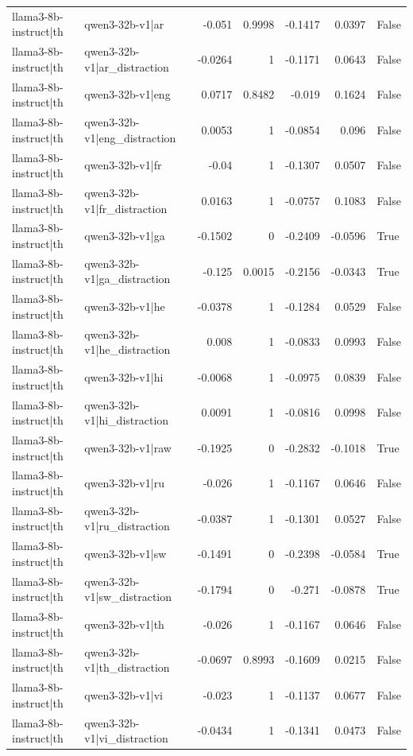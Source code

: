 \begin{table}
\begin{tabular}{l l r r r r l}
llama3-8b-instruct|th & qwen3-32b-v1|ar & -0.051 & 0.9998 & -0.1417 & 0.0397 & False \\
llama3-8b-instruct|th & qwen3-32b-v1|ar_distraction & -0.0264 & 1 & -0.1171 & 0.0643 & False \\
llama3-8b-instruct|th & qwen3-32b-v1|eng & 0.0717 & 0.8482 & -0.019 & 0.1624 & False \\
llama3-8b-instruct|th & qwen3-32b-v1|eng_distraction & 0.0053 & 1 & -0.0854 & 0.096 & False \\
llama3-8b-instruct|th & qwen3-32b-v1|fr & -0.04 & 1 & -0.1307 & 0.0507 & False \\
llama3-8b-instruct|th & qwen3-32b-v1|fr_distraction & 0.0163 & 1 & -0.0757 & 0.1083 & False \\
llama3-8b-instruct|th & qwen3-32b-v1|ga & -0.1502 & 0 & -0.2409 & -0.0596 & True \\
llama3-8b-instruct|th & qwen3-32b-v1|ga_distraction & -0.125 & 0.0015 & -0.2156 & -0.0343 & True \\
llama3-8b-instruct|th & qwen3-32b-v1|he & -0.0378 & 1 & -0.1284 & 0.0529 & False \\
llama3-8b-instruct|th & qwen3-32b-v1|he_distraction & 0.008 & 1 & -0.0833 & 0.0993 & False \\
llama3-8b-instruct|th & qwen3-32b-v1|hi & -0.0068 & 1 & -0.0975 & 0.0839 & False \\
llama3-8b-instruct|th & qwen3-32b-v1|hi_distraction & 0.0091 & 1 & -0.0816 & 0.0998 & False \\
llama3-8b-instruct|th & qwen3-32b-v1|raw & -0.1925 & 0 & -0.2832 & -0.1018 & True \\
llama3-8b-instruct|th & qwen3-32b-v1|ru & -0.026 & 1 & -0.1167 & 0.0646 & False \\
llama3-8b-instruct|th & qwen3-32b-v1|ru_distraction & -0.0387 & 1 & -0.1301 & 0.0527 & False \\
llama3-8b-instruct|th & qwen3-32b-v1|sw & -0.1491 & 0 & -0.2398 & -0.0584 & True \\
llama3-8b-instruct|th & qwen3-32b-v1|sw_distraction & -0.1794 & 0 & -0.271 & -0.0878 & True \\
llama3-8b-instruct|th & qwen3-32b-v1|th & -0.026 & 1 & -0.1167 & 0.0646 & False \\
llama3-8b-instruct|th & qwen3-32b-v1|th_distraction & -0.0697 & 0.8993 & -0.1609 & 0.0215 & False \\
llama3-8b-instruct|th & qwen3-32b-v1|vi & -0.023 & 1 & -0.1137 & 0.0677 & False \\
llama3-8b-instruct|th & qwen3-32b-v1|vi_distraction & -0.0434 & 1 & -0.1341 & 0.0473 & False \\

\end{tabular}
\end{table}
